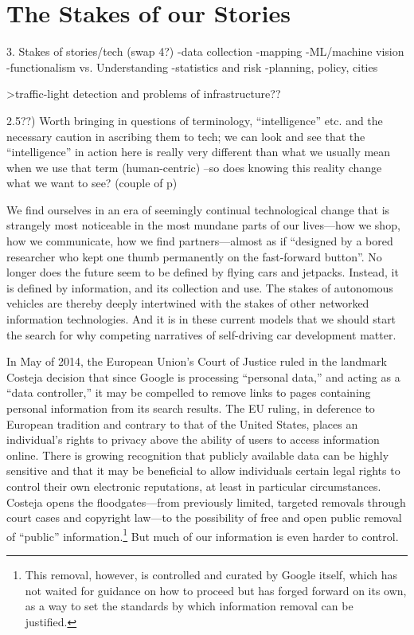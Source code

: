 \chapter{The Stakes of our Stories}
\label{chap:3}

3. Stakes of stories/tech (swap 4?)
-data collection
-mapping
-ML/machine vision
-functionalism vs. Understanding
-statistics and risk
-planning, policy, cities



>traffic-light detection and problems of infrastructure??


2.5??) Worth bringing in questions of terminology, ``intelligence''
etc. and the necessary caution in ascribing them to tech; we can look
and see that the ``intelligence'' in action here is really very
different than what we usually mean when we use that term
(human-centric)
--so does knowing this reality change what we want to see? (couple of
p)

We find ourselves in an era of seemingly continual technological
change that is strangely most noticeable in the most mundane parts of
our lives---how we shop, how we communicate, how we find
partners---almost as if ``designed by a bored researcher who kept one
thumb permanently on the fast-forward button''\cite[p.
  7]{???-Neuromancer1984}. No longer does the future seem to be
defined by flying cars and jetpacks. Instead, it is defined by
information, and its collection and use. The stakes of autonomous
vehicles are thereby deeply intertwined with the
stakes of other networked information technologies. And it is in these
current models that we should start the search for why competing
narratives of self-driving car development matter.

 In May of 2014, the European
Union's Court of Justice 
ruled in the landmark Costeja decision that since Google is processing
``personal data,'' and acting as a ``data controller,'' it may be
compelled to remove links to pages containing personal information
from its search results.\cite{???} The EU ruling, in deference to European
tradition and contrary to that of the United States, places an
individual's rights to privacy above the ability of users to access
information online.\cite{???} There is growing recognition that publicly
available data can be highly sensitive and that it may be beneficial
to allow individuals certain legal rights to control their own
electronic reputations, at least in particular circumstances. Costeja
opens the floodgates---from previously limited, targeted removals
through court cases and copyright law---to the possibility of free and
open public removal of ``public'' information.\footnote{This removal,
  however, is controlled and curated by Google itself, which has not
  waited for guidance on how to proceed but has forged forward on its
  own, as a way to set the standards by which information removal can
  be justified.\cite{???-http://www.theguardian.com/technology/2015/feb/18/the-right-be-forgotten-google-search}} But much of our
information is even harder to control.

